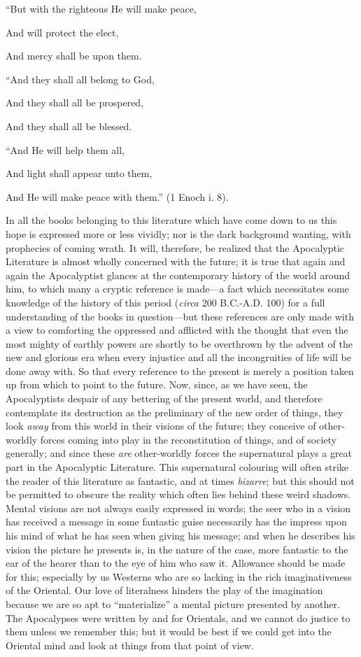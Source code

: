 “But with the righteous He will make peace,

And will protect the elect,

And mercy shall be upon them.

“And they shall all belong to God,

And they shall all be prospered,

And they shall all be blessed.

“And He will help them all,

And light shall appear unto them,

And He will make peace with them.” (1 Enoch i. 8).

In all the books belonging to this literature which
have come down to us this hope is expressed more or
less vividly; nor is the dark background wanting,
with prophecies of coming wrath. It will, therefore,
be realized that the Apocalyptic Literature is almost
wholly concerned with the future; it is true that
again and again the Apocalyptist glances at the
contemporary history of the world around him, to
which many a cryptic reference is made—a fact which
necessitates some knowledge of the history of this
period (\emph{circa} 200 B.C.-A.D. 100) for a full understanding
of the books in question—but these references are
only made with a view to comforting the oppressed
and afflicted with the thought that even the most
mighty of earthly powers are shortly to be overthrown
by the advent of the new and glorious era
when every injustice and all the incongruities of life
will be done away with. So that every reference to
the present is merely a position taken up from which
to point to the future. Now, since, as we have seen,
the Apocalyptists despair of any bettering of the
present world, and therefore contemplate its destruction
as the preliminary of the new order of things,
they look \emph{away} from this world in their visions of
the future; they conceive of other-worldly forces
coming into play in the reconstitution of things, and
of society generally; and since these \emph{are} other-worldly
forces the supernatural plays a great part in the
Apocalyptic Literature. This supernatural colouring
will often strike the reader of this literature as
fantastic, and at times \emph{bizarre}; but this should not
be permitted to obscure the reality which often lies
behind these weird shadows. Mental visions are not
always easily expressed in words; the seer who in
a vision has received a message in some fantastic
guise necessarily has the impress upon his mind of
what he has seen when giving his message; and when
he describes his vision the picture he presents is,
in the nature of the case, more fantastic to the ear
of the hearer than to the eye of him who saw it.
Allowance should be made for this; especially by us
Westerns who are so lacking in the rich imaginativeness
of the Oriental. Our love of literalness hinders
the play of the imagination because we are so apt
to “materialize” a mental picture presented by
another. The Apocalypses were written by and for
Orientals, and we cannot do justice to them unless
we remember this; but it would be best if we could
get into the Oriental mind and look at things from
that point of view.

